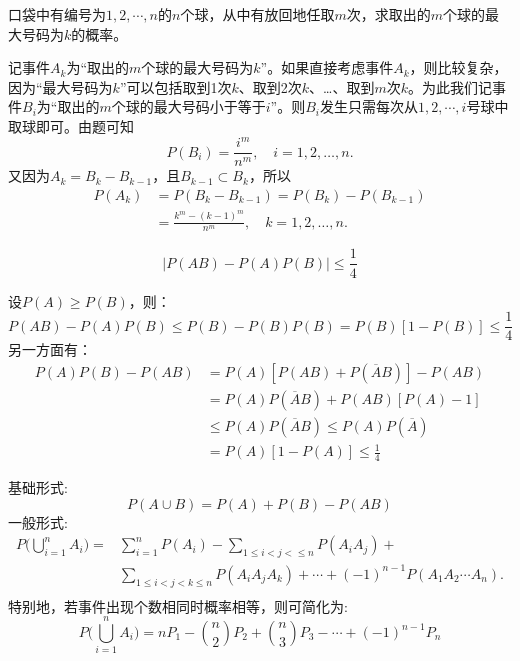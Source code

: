 \begin{example}
    口袋中有编号为$1, 2, \cdots, n$的$n$个球，从中有放回地任取$m$次，求取出的$m$个球的最大号码为$k$的概率。
\end{example}
\begin{solution}
    记事件$A_k$为“取出的$m$个球的最大号码为$k$”。如果直接考虑事件$A_k$，则比较复杂，因为“最大号码为$k$”可以包括取到1次$k$、取到2次$k$、\dots、取到$m$次$k$。为此我们记事件$B_i$为“取出的$m$个球的最大号码小于等于$i$”。则$B_i$发生只需每次从$1,2,\cdots ,i$号球中取球即可。由题可知
    \[  P(B_i) = \frac{i^m}{n^m}, \quad i = 1, 2, \dotsc, n. \]
    又因为$A_k = B_k - B_{k-1}$，且$B_{k-1} \subset B_k$，所以
    \begin{align*}
        P(A_k) & = P(B_k - B_{k-1}) = P(B_k) - P(B_{k-1})                 \\
               & = \frac{k^m - (k - 1)^m}{n^m}, \quad k = 1,2, \dotsc, n.
    \end{align*}
\end{solution}

\begin{example}
    \[ \lvert P(AB) - P(A)P(B) \rvert \le \frac1{4} \]
\end{example}
\begin{solution}
    设$P(A)\ge P(B)$，则：
    \[ P(AB)-P(A)P(B)\le P(B)-P(B)P(B)=P(B)[1-P(B)]\le \frac1{4} \]
    另一方面有：
    \begin{align*}
        P(A)P(B)-P(AB) & =P(A)[P(AB)+P(\overline{A}B)]-P(AB)              \\
                       & =P(A)P(\overline{A}B)+P(AB)[P(A)-1]              \\
                       & \le P(A)P(\overline{A}B) \le P(A)P(\overline{A}) \\
                       & =P(A)[1-P(A)]\le \frac1{4}
    \end{align*}
\end{solution}

\begin{proposition}[加法公式]\label{pro:addition_law}
    基础形式:
    \[ P(A \cup B) = P(A) + P(B) - P(AB) \]
    一般形式:
    \begin{align*}
        P\biggl(\bigcup_{i=1}^n A_i \biggr)= & \sum_{i=1}^n P(A_i) - \sum_{1\le i < j < \le n}P(A_i A_j)+                              \\
                                             & \sum_{1 \le i < j < k \le n} P(A_i A_j A_k)+ \dotsb + (-1)^{n-1} P(A_1 A_2 \dotsb A_n). \\
    \end{align*}
    特别地，若事件出现个数相同时概率相等，则可简化为:
    \[ P\biggl( \bigcup_{i=1}^n A_i \biggr)=n P_{1} - \binom{n}{2} P_{2} + \binom{n}{3} P_{3}- \cdots+(-1)^{n-1} P_{n} \]
\end{proposition}

